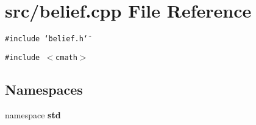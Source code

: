 \section{src/belief.cpp File Reference}
\label{belief_8cpp}
{\tt \#include \char`\"{}belief.h\char`\"{}}\par
{\tt \#include $<$cmath$>$}\par
\subsection*{Namespaces}
\begin{CompactItemize}
\item 
namespace {\bf std}
\end{CompactItemize}
